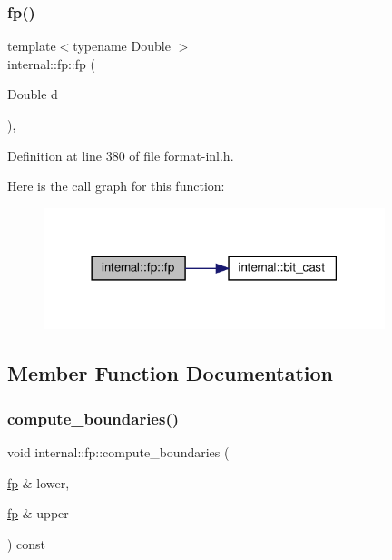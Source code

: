 \mbox{\label{classinternal_1_1fp_a8829f486ec892cdd08e1f856facb5f9b}} 
\subsubsection{\texorpdfstring{fp()}{fp()}\hspace{0.1cm}{\footnotesize\ttfamily [3/3]}}
{\footnotesize\ttfamily template$<$typename Double $>$ \\
internal\+::fp\+::fp (\begin{DoxyParamCaption}\item[{Double}]{d }\end{DoxyParamCaption})\hspace{0.3cm}{\ttfamily [inline]}, {\ttfamily [explicit]}}



Definition at line 380 of file format-\/inl.\+h.

Here is the call graph for this function\+:
\nopagebreak
\begin{figure}[H]
\begin{center}
\leavevmode
\includegraphics[width=282pt]{classinternal_1_1fp_a8829f486ec892cdd08e1f856facb5f9b_cgraph}
\end{center}
\end{figure}


\subsection{Member Function Documentation}
\mbox{\label{classinternal_1_1fp_ab235dc2ba165fadc8342cf2be3365a77}} 
\subsubsection{\texorpdfstring{compute\+\_\+boundaries()}{compute\_boundaries()}}
{\footnotesize\ttfamily void internal\+::fp\+::compute\+\_\+boundaries (\begin{DoxyParamCaption}\item[{\hyperlink{classinternal_1_1fp}{fp} \&}]{lower,  }\item[{\hyperlink{classinternal_1_1fp}{fp} \&}]{upper }\end{DoxyParamCaption}) const\hspace{0.3cm}{\ttfamily [inline]}}



